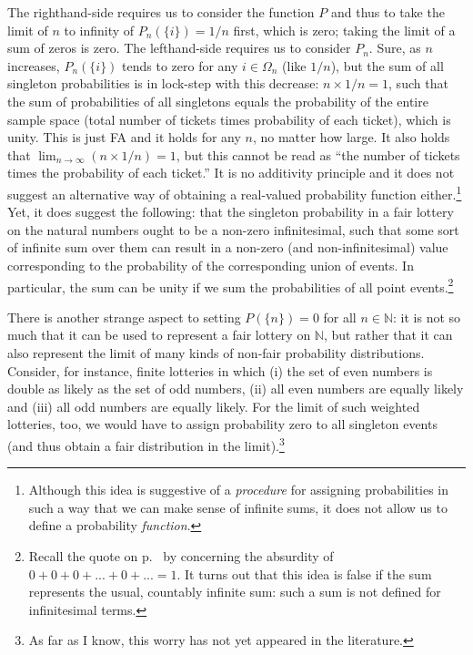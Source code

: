 The righthand-side requires us to consider the function $P$ and thus to take the limit of $n$ to infinity of $P_n(\{i\})=1/n$ first, which is zero; taking the limit of a sum of zeros is zero.
The lefthand-side requires us to consider $P_n$. Sure, as $n$ increases, $P_n(\{i\})$ tends to zero for any $i \in \Omega_n$ (like $1/n$), but the sum of all singleton probabilities is in lock-step with this decrease: $n \times  1/n=1$, such that the sum of probabilities of all singletons equals the probability of the entire sample space (total number of tickets times probability of each ticket), which is unity. This is just FA and it holds for any $n$, no matter how large. It also holds that $\lim_{n\rightarrow\infty} (n \times  1/n)=1$, but this cannot be read as ``the number of tickets times the probability of each ticket.'' It is no additivity principle and it does not suggest an alternative way of obtaining a real-valued probability function either.\footnote{Although this idea is suggestive of a \emph{procedure} for assigning probabilities in such a way that we can make sense of infinite sums, it does not allow us to define a probability \emph{function}.}
Yet, it does suggest the following: that the singleton probability in a fair lottery on the natural numbers ought to be a non-zero infinitesimal, such that some sort of infinite sum over them can result in a non-zero (and non-infinitesimal) value corresponding to the probability of the corresponding union of events.
In particular, the sum can be unity if we sum the probabilities of all point events.\footnote{Recall the quote on p.~\pageref{quote:dF} by \citet[p.~347]{deFinetti:1974} concerning the absurdity of $0+0+0+ ... +0+ ... =1$. It turns out that this idea is false if the sum represents the usual, countably infinite sum: such a sum is not defined for infinitesimal terms.}

There is another strange aspect to setting $P(\{n\})=0$ for all $n \in \mathbb{N}$: it is not so much that it can be used to represent a fair lottery on $\mathbb{N}$, but rather that it can also represent the limit of many kinds of non-fair probability distributions. Consider, for instance, finite lotteries in which (i) the set of even numbers is double as likely as the set of odd numbers, (ii) all even numbers are equally likely and (iii) all odd numbers are equally likely. For the limit of such weighted lotteries, too, we would have to assign probability zero to all singleton events (and thus obtain a fair distribution in the limit).\footnote{As far as I know, this worry has not yet appeared in the literature.}

